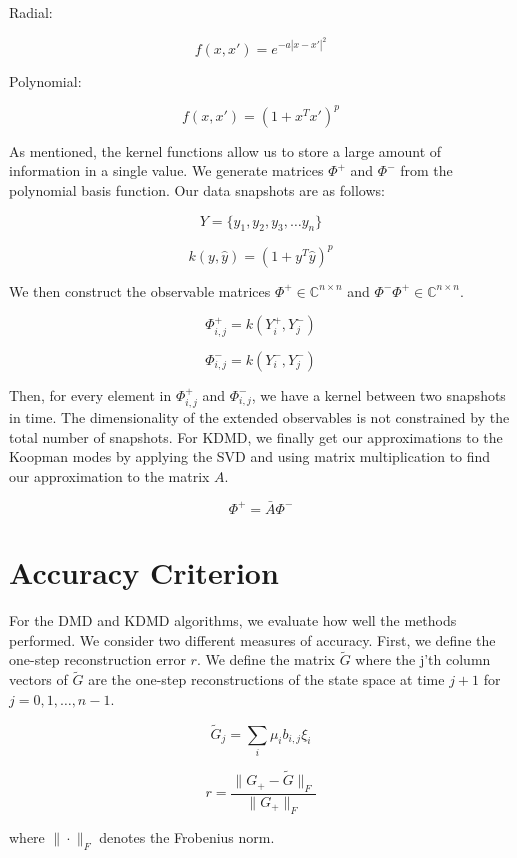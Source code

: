 \vspace{3mm}

\noindent Radial: 

$$
f(x,x') = e^{-a|x-x'|^2}
$$

\vspace{3mm}


\noindent Polynomial:

$$
f(x,x') = (1 + x^Tx')^p
$$

\vspace{3mm}

As mentioned, the kernel functions allow us to store a large amount of information in a single value. We generate matrices
$\Phi^+$ and $\Phi^-$ from the polynomial basis function. Our data snapshots are as
follows:

$$
 Y = \{y_1,y_2,y_3, \dots y_n\}
$$

$$
k (y,{\hat y}) = (1 + y^T {\hat y})^p
$$

\noindent We then construct the observable matrices $\Phi^{+}\in \mathbb{C}^{n \times n}$ and $ \Phi^{-}\Phi^{+}\in \mathbb{C}^{n \times n}$.

$$
\Phi^{+}_{i,j} = k(Y^{+}_{i}, Y^{-}_j)
$$

$$
\Phi^{-}_{i,j} = k(Y^{-}_{i}, Y^{-}_j)
$$

\noindent Then, for every element in $\Phi^{+}_{i,j}$ and $\Phi^{-}_{i,j}$, we have a kernel between two snapshots in time. The dimensionality of the
extended observables is not constrained by the total number of snapshots. For KDMD, we finally get
our approximations to the Koopman modes by applying the SVD and using matrix multiplication to find our approximation to the matrix $A$.

$$
\Phi^{+} = {\bar A} \Phi^{-}
$$

\section{Accuracy Criterion}
For the DMD and KDMD algorithms, we evaluate how
well the methods performed. We consider two different measures
of accuracy. First, we define the one-step reconstruction
error $r$. We define the matrix ${\tilde G}$ where the j'th column vectors of ${\tilde G}$ are the one-step
reconstructions of the state space at time $j+1$ for $j=0,1,\dots, n-1$.

$$
{\tilde G}_{j} = \sum_{i} \mu_i b_{i,j} \xi_i
$$

$$
r = \frac{\|G_{+} - {\tilde G} \|_F}{\|G_{+}\|_F}
$$

\noindent where $\| \cdot \|_F$ denotes the Frobenius norm.

